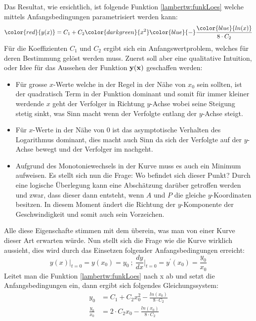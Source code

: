 Das Resultat, wie ersichtlich, ist folgende Funktion \eqref{lambertw:funkLoes} welche mittels Anfangsbedingungen parametrisiert werden kann: 
\begin{equation}
	{\color{red}{y(x)}}
	=
	C_1 + C_2 {\color{darkgreen}{x^2}} {\color{blue}{-}} \frac{\color{blue}{ln(x)}}{8 \cdot C_2}
	\label{lambertw:funkLoes}
\end{equation}
Für die Koeffizienten \(C_1\) und \(C_2\) ergibt sich ein Anfangswertproblem, welches für deren Bestimmung gelöst werden muss. Zuerst soll aber eine qualitative Intuition, oder Idee für das Aussehen der Funktion \(\bf{y(x)}\) geschaffen werden:
\begin{itemize}
	\item
	Für grosse \(x\)-Werte welche in der Regel in der Nähe von \(x_0\) sein sollten, ist der quadratisch Term in der Funktion dominant und somit für immer kleiner werdende \(x\) geht der Verfolger in Richtung \(y\)-Achse wobei seine Steigung stetig sinkt, was Sinn macht wenn der Verfolgte entlang der \(y\)-Achse steigt.
	\item
	Für \(x\)-Werte in der Nähe von \(0\) ist das asymptotische Verhalten des Logarithmus dominant, dies macht auch Sinn da sich der Verfolgte auf der \(y\)-Achse bewegt und der Verfolger im nachgeht.
	\item
	Aufgrund des Monotoniewechsels in der Kurve muss es auch ein Minimum aufweisen. Es stellt sich nun die Frage: Wo befindet sich dieser Punkt? Durch eine logische Überlegung kann eine Abschätzung darüber getroffen werden und zwar, dass dieser dann entsteht, wenn \(A\) und \(P\) die gleiche \(y\)-Koordinaten besitzen. In diesem Moment ändert die Richtung der \(y\)-Komponente der Geschwindigkeit und somit auch sein Vorzeichen.
\end{itemize}
Alle diese Eigenschafte stimmen mit dem überein, was man von einer Kurve dieser Art erwarten würde. Nun stellt sich die Frage wie die Kurve wirklich aussieht, dies wird durch das Einsetzen folgender Anfangsbedingungen erreicht:
\begin{equation}
	y(x)\big \vert_{t=0}
	=
	y(x_0)
	= 
	y_0
	\:;\:
	\frac{dy}{dx}\bigg \vert_{t=0}
	=
	y^{\prime}(x_0)
	=
	\frac{y_0}{x_0}
\end{equation}
Leitet man die Funktion \eqref{lambertw:funkLoes} nach x ab und setzt die Anfangsbedingungen ein, dann ergibt sich folgendes Gleichungssystem:
\begin{subequations}
	\begin{align}
		y_0
		&=
		C_1 + C_2 x^2_0 - \frac{ln(x_0)}{8 \cdot C_2} \\
		\frac{y_0}{x_0}
		&=
		 2 \cdot  C_2 x_0 - \frac{ln(x_0)}{8 \cdot C_2}
	\end{align}
\end{subequations}
